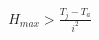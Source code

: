 \documentclass[12pt]{article}
\begin{document}
\begin{align*}
H_{max} > \frac{T_j - T_a}{i^2}
\end{align*}
\end{document}

